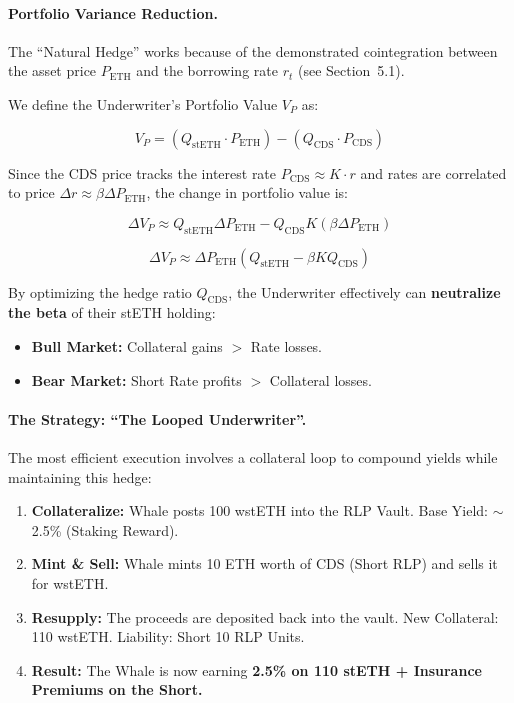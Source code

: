 \documentclass[12pt]{article}
\begin{document}
\paragraph{Portfolio Variance Reduction.}
The ``Natural Hedge'' works because of the demonstrated cointegration between the asset price $P_{\text{ETH}}$ and the borrowing rate $r_t$ (see Section~5.1).

We define the Underwriter's Portfolio Value $V_P$ as:

\begin{equation}
    V_P = (Q_{\text{stETH}} \cdot P_{\text{ETH}}) - (Q_{\text{CDS}} \cdot P_{\text{CDS}})
\end{equation}

Since the CDS price tracks the interest rate $P_{\text{CDS}} \approx K \cdot r$ and rates are correlated to price $\Delta r \approx \beta \Delta P_{\text{ETH}}$, the change in portfolio value is:

\begin{equation}
    \Delta V_P \approx Q_{\text{stETH}} \Delta P_{\text{ETH}} - Q_{\text{CDS}} K (\beta \Delta P_{\text{ETH}})
\end{equation}

\begin{equation}
    \Delta V_P \approx \Delta P_{\text{ETH}} (Q_{\text{stETH}} - \beta K Q_{\text{CDS}})
\end{equation}

By optimizing the hedge ratio $Q_{\text{CDS}}$, the Underwriter effectively can \textbf{neutralize the beta} of their stETH holding:

\begin{itemize}
    \item \textbf{Bull Market:} Collateral gains $>$ Rate losses.
    \item \textbf{Bear Market:} Short Rate profits $>$ Collateral losses.
\end{itemize}

\paragraph{The Strategy: ``The Looped Underwriter''.}
The most efficient execution involves a collateral loop to compound yields while maintaining this hedge:

\begin{enumerate}
    \item \textbf{Collateralize:} Whale posts 100 wstETH into the RLP Vault. Base Yield: $\sim$2.5\% (Staking Reward).
    \item \textbf{Mint \& Sell:} Whale mints 10 ETH worth of CDS (Short RLP) and sells it for wstETH.
    \item \textbf{Resupply:} The proceeds are deposited back into the vault. New Collateral: 110 wstETH. Liability: Short 10 RLP Units.
    \item \textbf{Result:} The Whale is now earning \textbf{2.5\% on 110 stETH + Insurance Premiums on the Short.}
\end{enumerate}
\end{document}
